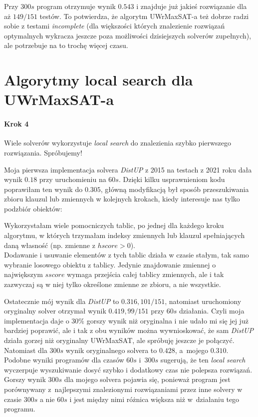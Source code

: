 \documentclass[shortabstract]{iithesis}
\begin{document}
Przy $300s$ program otrzymuje wynik $0.543$ i znajduje już jakieś rozwiązanie dla aż $149/151$ testów. To potwierdza, że algorytm UWrMaxSAT-a też dobrze radzi sobie z testami \textit{incomplete} (dla większości których znalezienie rozwiązań optymalnych wykracza jeszcze poza możliwości dzisiejszych solverów zupełnych), ale potrzebuje na to trochę więcej czasu.

\section{Algorytmy local search dla UWrMaxSAT-a}
\paragraph{Krok 4}
Wiele solverów wykorzystuje \textit{local search} do znalezienia szybko pierwszego rozwiązania. Spróbujemy!

Moja pierwsza implementacja solvera \textit{DistUP} z 2015 na testach z 2021 roku dała wynik $0.18$ przy uruchomieniu na $60s$. Dzięki kilku usprawnieniom kodu poprawiłam ten wynik do $0.305$, główną modyfikacją był sposób przeszukiwania zbioru klauzul lub zmiennych w kolejnych krokach, kiedy interesuje nas tylko podzbiór obiektów:

Wykorzystałam wiele pomocniczych tablic, po jednej dla każdego kroku algorytmu, w których trzymałam indeksy zmiennych lub klauzul spełniających daną własność (np. zmienne z $hscore > 0$). \\ 
Dodawanie i usuwanie elementów z tych tablic działa w czasie stałym, tak samo wybranie losowego obiektu z tablicy. Jedynie znajdowanie zmiennej o największym $sscore$ wymaga przejścia całej tablicy zmiennych, ale i tak zazwyczaj są w niej tylko określone zmienne ze zbioru, a nie wszystkie.

Ostatecznie mój wynik dla \textit{DistUP} to $0.316, 101/151$, natomiast uruchomiony oryginalny solver otrzymał wynik $0.419, 99/151$ przy $60s$ działania. Czyli moja implementacja daje o $30\%$ gorszy wynik niż oryginalna i nie udało mi się jej już bardziej poprawić, ale i tak z obu wyników można wywnioskować, że sam \textit{DistUP} działa gorzej niż oryginalny UWrMaxSAT, ale spróbuję jeszcze je połączyć. 
Natomiast dla $300s$ wynik oryginalnego solvera to $0.428$, a~mojego $0.310$.
Podobne wyniki programów dla czasów $60s$ i~$300s$ sugerują, że ten \textit{local search} wyczerpuje wyszukiwanie dosyć szybko i dodatkowy czas nie polepsza rozwiązań. Gorszy wynik $300s$ dla mojego solvera pojawia się, ponieważ program jest porównywany z~najlepszymi znalezionymi rozwiązaniami przez inne solvery w czasie $300s$ a nie $60s$ i jest między nimi różnica większa niż w~działaniu tego programu. 
\end{document}
